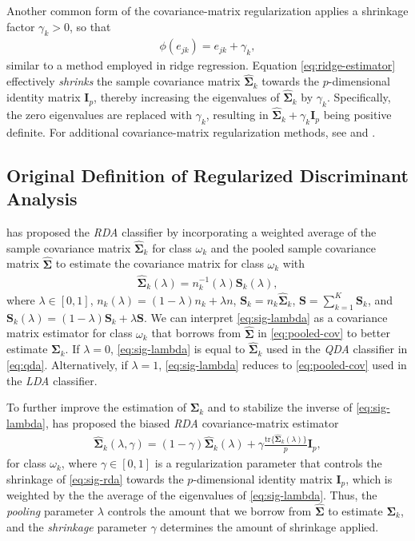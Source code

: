 \documentclass[11pt]{article}
\newcommand{\tr}{\text{tr}}
\begin{document}
Another common form of the covariance-matrix regularization applies a shrinkage factor $\gamma_k > 0$, so that
\begin{align}
	\phi(e_{jk}) = e_{jk} + \gamma_k, \label{eq:ridge-estimator}
\end{align}
similar to a method employed in ridge regression. Equation \eqref{eq:ridge-estimator} effectively \emph{shrinks} the sample covariance matrix $\widehat{\bm\Sigma}_k$ towards the $p$-dimensional identity matrix $\bm I_p$, thereby increasing the eigenvalues of $\widehat{\bm\Sigma}_k$ by $\gamma_k$. Specifically, the zero eigenvalues are replaced with $\gamma_k$, resulting in $\widehat{\bm \Sigma}_k + \gamma_k \bm I_p$ being positive definite. For additional covariance-matrix regularization methods, see \cite{Ye:2009gd} and \cite{Ramey:2011ji}.

\subsection{Original Definition of Regularized Discriminant Analysis}

\cite{Friedman:1989tm} has proposed the \emph{RDA} classifier by incorporating a weighted average of the sample covariance matrix $\widehat{\bm \Sigma}_k$ for class $\omega_k$ and the pooled sample covariance matrix $\widehat{\bm\Sigma}$ to estimate the covariance matrix for class $\omega_k$ with
\begin{align}
  \widehat{\bm\Sigma}_k(\lambda) = n_k^{-1}(\lambda) \bm S_k(\lambda),\label{eq:sig-lambda}
\end{align}
where $\lambda \in [0, 1]$, $n_k(\lambda) = (1 - \lambda) n_k + \lambda n$, $\bm S_k = n_k \widehat{\bm\Sigma}_k$, $\bm S = \sum_{k=1}^K \bm S_k$, and $\bm S_k(\lambda) = (1 - \lambda) \bm S_k + \lambda \bm S$. We can interpret \eqref{eq:sig-lambda} as a covariance matrix estimator for class $\omega_k$ that borrows from $\widehat{\bm\Sigma}$ in \eqref{eq:pooled-cov} to better estimate $\bm \Sigma_k$. If $\lambda = 0$, \eqref{eq:sig-lambda} is equal to $\widehat{\bm\Sigma}_k$ used in the \emph{QDA} classifier in \eqref{eq:qda}. Alternatively, if $\lambda = 1$, \eqref{eq:sig-lambda} reduces to \eqref{eq:pooled-cov} used in the \emph{LDA} classifier.

To further improve the estimation of $\bm \Sigma_k$ and to stabilize the inverse of \eqref{eq:sig-lambda}, \cite{Friedman:1989tm} has proposed the biased \emph{RDA} covariance-matrix estimator
\begin{align}
	\widehat{\bm\Sigma}_k(\lambda, \gamma) = (1 - \gamma) \widehat{\bm\Sigma}_k(\lambda) + \gamma \frac{\tr\{\widehat{\bm\Sigma}_k(\lambda)\}}{p} \bm I_p,\label{eq:sig-rda}
\end{align}
for class $\omega_k$, where $\gamma \in [0, 1]$ is a regularization parameter that controls the shrinkage of \eqref{eq:sig-rda}  towards the $p$-dimensional identity matrix $\bm I_p$, which is weighted by the the average of the eigenvalues of \eqref{eq:sig-lambda}. Thus, the \emph{pooling} parameter $\lambda$ controls the amount that we borrow from $\widehat{\bm\Sigma}$ to estimate $\bm \Sigma_k$, and the \emph{shrinkage} parameter $\gamma$ determines the amount of shrinkage applied.
\end{document}
